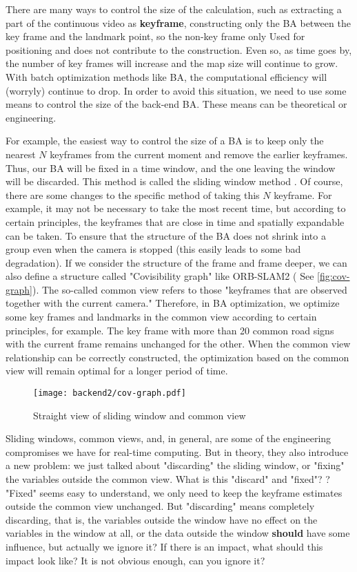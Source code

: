 There are many ways to control the size of the calculation, such as extracting a part of the continuous video as \textbf{keyframe}\textsuperscript{\cite{Leutenegger2015}}, constructing only the BA between the key frame and the landmark point, so the non-key frame only Used for positioning and does not contribute to the construction. Even so, as time goes by, the number of key frames will increase and the map size will continue to grow. With batch optimization methods like BA, the computational efficiency will (worryly) continue to drop. In order to avoid this situation, we need to use some means to control the size of the back-end BA. These means can be theoretical or engineering.

For example, the easiest way to control the size of a BA is to keep only the nearest $N$ keyframes from the current moment and remove the earlier keyframes. Thus, our BA will be fixed in a time window, and the one leaving the window will be discarded. This method is called the sliding window method \textsuperscript{\cite{Sibley2008}}. Of course, there are some changes to the specific method of taking this $N$ keyframe. For example, it may not be necessary to take the most recent time, but according to certain principles, the keyframes that are close in time and spatially expandable can be taken. To ensure that the structure of the BA does not shrink into a group even when the camera is stopped (this easily leads to some bad degradation). If we consider the structure of the frame and frame deeper, we can also define a structure called "Covisibility graph" like ORB-SLAM2\textsuperscript{\cite{Mur-Artal2015}} ( See \autoref{fig:cov-graph}). The so-called common view refers to those "keyframes that are observed together with the current camera." Therefore, in BA optimization, we optimize some key frames and landmarks in the common view according to certain principles, for example. The key frame with more than 20 common road signs with the current frame remains unchanged for the other. When the common view relationship can be correctly constructed, the optimization based on the common view will remain optimal for a longer period of time.

\begin{figure}[!ht]
\centering
\texttt{[image: backend2/cov-graph.pdf]}
\caption{Straight view of sliding window and common view}
\label{fig:cov-graph}
\end{figure}

Sliding windows, common views, and, in general, are some of the engineering compromises we have for real-time computing. But in theory, they also introduce a new problem: we just talked about "discarding" the sliding window, or "fixing" the variables outside the common view. What is this "discard" and "fixed"? ? "Fixed" seems easy to understand, we only need to keep the keyframe estimates outside the common view unchanged. But "discarding" means completely discarding, that is, the variables outside the window have no effect on the variables in the window at all, or the data outside the window \textbf{should} have some influence, but actually we ignore it? If there is an impact, what should this impact look like? It is not obvious enough, can you ignore it?

